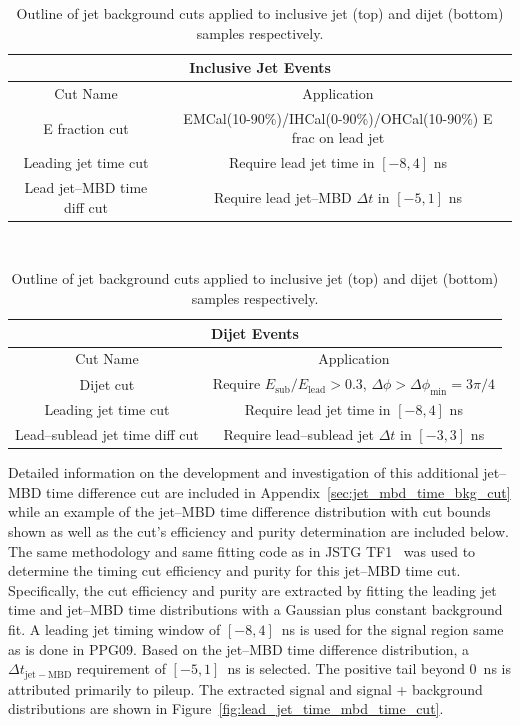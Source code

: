 \begin{table}[]
    \centering
    \begin{tabular}{c|c}
        \multicolumn{2}{c}{Inclusive Jet Events} \\
        \hline
        Cut Name & Application \\
        \hline
        E fraction cut & EMCal(10-90\%)/IHCal(0-90\%)/OHCal(10-90\%) E frac on lead jet \\
        Leading jet time cut & Require lead jet time in $[-8,4]$ ns \\
        Lead jet--MBD time diff cut & Require lead jet--MBD $\Delta t$ in $[-5,1]$ ns \\
    \end{tabular} \\
    \bigskip \bigskip
    \begin{tabular}{c|c}
        \multicolumn{2}{c}{Dijet Events} \\
        \hline
        Cut Name & Application \\
        \hline
        Dijet cut & Require $E_{\mathrm{sub}}/E_{\mathrm{lead}}>0.3$, $\Delta\phi>\Delta\phi_{\mathrm{min}} = 3\pi / 4$ \\
        Leading jet time cut & Require lead jet time in $[-8,4]$ ns \\
        Lead--sublead jet time diff cut & Require lead--sublead jet $\Delta t$ in $[-3,3]$ ns \\
    \end{tabular}
    \caption{Outline of jet background cuts applied to inclusive jet (top) and dijet (bottom) samples respectively.}
    \label{tab:jet_background_cuts}
\end{table}

Detailed information on the development and investigation of this additional jet--MBD time difference cut are included in Appendix~\ref{sec:jet_mbd_time_bkg_cut} while an example of the jet--MBD time difference distribution with cut bounds shown as well as the cut's efficiency and purity determination are included below. The same methodology and same fitting code as in JSTG TF1~\cite{tf1_note} was used to determine the timing cut efficiency and purity for this jet--MBD time cut.
Specifically, the cut efficiency and purity are extracted by fitting the leading jet time and jet--MBD time distributions with a Gaussian plus constant background fit. 
A leading jet timing window of $[-8,4]$~ns is used for the signal region same as is done in PPG09. 
Based on the jet--MBD time difference distribution, a $\Delta t_{\mathrm{jet-MBD}}$ requirement of $[-5,1]$~ns is selected. 
The positive tail beyond 0~ns is attributed primarily to pileup.
The extracted signal and signal + background distributions are shown in Figure~\ref{fig:lead_jet_time_mbd_time_cut}.

